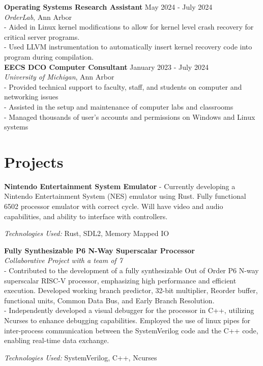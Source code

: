 \documentclass[9pt]{extarticle}
\begin{document}
\textbf{Operating Systems Research Assistant} \hfill May 2024 - July 2024 \\
\textit{OrderLab}, Ann Arbor \\
- Aided in Linux kernel modifications to allow for kernel level crash recovery for critical server programs. \\
- Used LLVM instrumentation to automatically insert kernel recovery code into program during compilation. \\

\textbf{EECS DCO Computer Consultant} \hfill January 2023 - July 2024 \\
\textit{University of Michigan}, Ann Arbor \\
- Provided technical support to faculty, staff, and students on computer and networking issues \\
- Assisted in the setup and maintenance of computer labs and classrooms \\
- Managed thousands of user's accounts and permissions on Windows and Linux systems

\section*{Projects}
\noindent \textbf{Nintendo Entertainment System Emulator}
- Currently developing a Nintendo Entertainment System (NES) emulator using Rust.
Fully functional 6502 processor emulator with correct cycle. Will have video and audio capabilities, and ability to interface with controllers.

\textit{Technologies Used:} Rust, SDL2, Memory Mapped IO

\noindent \textbf{Fully Synthesizable P6 N-Way Superscalar Processor} \\
\textit{Collaborative Project with a team of 7} \\
- Contributed to the development of a fully synthesizable Out of Order P6 N-way superscalar RISC-V processor, emphasizing high performance and efficient execution.
Developed working branch predictor, 32-bit multiplier, Reorder buffer, functional units, Common Data Bus, and Early Branch Resolution.  \\
- Independently developed a visual debugger for the processor in C++,
utilizing Ncurses to enhance debugging capabilities.
Employed the use of linux pipes for inter-process communication between the SystemVerilog code
and the C++ code, enabling real-time data exchange.

\textit{Technologies Used:} SystemVerilog, C++, Ncurses
\end{document}
